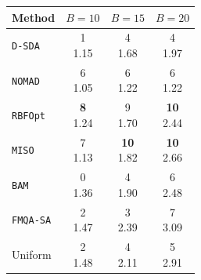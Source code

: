 \begin{tabular}{@{}lccc@{}}\toprule
Method & \(B=10\) & \(B=15\) & \(B=20\)\\\midrule
\texttt{D-SDA} & \makecell{1\\1.15} & \makecell{4\\1.68} & \makecell{4\\1.97} \\
\texttt{NOMAD} & \makecell{6\\1.05} & \makecell{6\\1.22} & \makecell{6\\1.22} \\
\texttt{RBFOpt} & \makecell{\textbf{8}\\1.24} & \makecell{9\\1.70} & \makecell{\textbf{10}\\2.44} \\
\texttt{MISO} & \makecell{7\\1.13} & \makecell{\textbf{10}\\1.82} & \makecell{\textbf{10}\\2.66} \\
\texttt{BAM} & \makecell{0\\1.36} & \makecell{4\\1.90} & \makecell{6\\2.48} \\
\texttt{FMQA-SA} & \makecell{2\\1.47} & \makecell{3\\2.39} & \makecell{7\\3.09} \\
Uniform & \makecell{2\\1.48} & \makecell{4\\2.11} & \makecell{5\\2.91} \\
\bottomrule\end{tabular}
